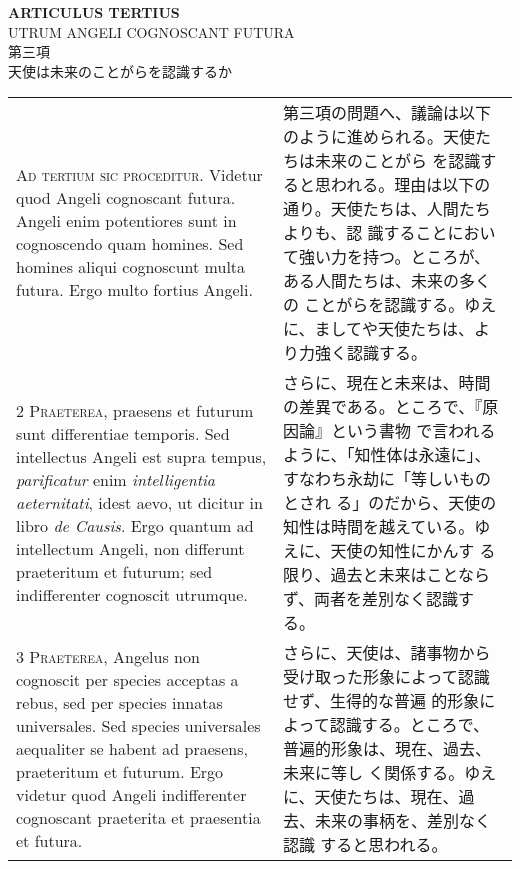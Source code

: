 \documentclass[10pt]{jsarticle} %
\begin{document}
\begin{center}
{\Large {\bf ARTICULUS TERTIUS}}\\ {\large UTRUM ANGELI COGNOSCANT
FUTURA}\\ {\Large 第三項\\天使は未来のことがらを認識するか}
\end{center}

\begin{longtable}{p{21em}p{21em}}

{\huge A}{\scshape d tertium sic proceditur}. Videtur quod Angeli
cognoscant futura. Angeli enim potentiores sunt in cognoscendo quam
homines. Sed homines aliqui cognoscunt multa futura. Ergo multo
fortius Angeli.


&

第三項の問題へ、議論は以下のように進められる。天使たちは未来のことがら
を認識すると思われる。理由は以下の通り。天使たちは、人間たちよりも、認
識することにおいて強い力を持つ。ところが、ある人間たちは、未来の多くの
ことがらを認識する。ゆえに、ましてや天使たちは、より力強く認識する。


\\


{\scshape 2 Praeterea}, praesens et futurum sunt differentiae
temporis. Sed intellectus Angeli est supra tempus, {\itshape
parificatur} enim {\itshape intelligentia aeternitati}, idest aevo, ut
dicitur in libro {\itshape de Causis}. Ergo quantum ad intellectum
Angeli, non differunt praeteritum et futurum; sed indifferenter
cognoscit utrumque.


&

さらに、現在と未来は、時間の差異である。ところで、『原因論』という書物
で言われるように、「知性体は永遠に」、すなわち永劫に「等しいものとされ
る」のだから、天使の知性は時間を越えている。ゆえに、天使の知性にかんす
る限り、過去と未来はことならず、両者を差別なく認識する。


\\


{\scshape 3 Praeterea}, Angelus non cognoscit per species acceptas a
rebus, sed per species innatas universales. Sed species universales
aequaliter se habent ad praesens, praeteritum et futurum. Ergo videtur
quod Angeli indifferenter cognoscant praeterita et praesentia et
futura.


&

さらに、天使は、諸事物から受け取った形象によって認識せず、生得的な普遍
的形象によって認識する。ところで、普遍的形象は、現在、過去、未来に等し
く関係する。ゆえに、天使たちは、現在、過去、未来の事柄を、差別なく認識
すると思われる。



\end{longtable}
\end{document}
